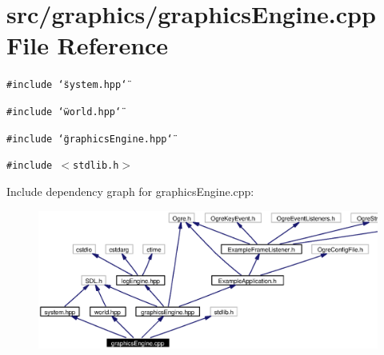 \section{src/graphics/graphics\-Engine.cpp File Reference}
\label{graphicsEngine_8cpp}
{\tt \#include \char`\"{}system.hpp\char`\"{}}\par
{\tt \#include \char`\"{}world.hpp\char`\"{}}\par
{\tt \#include \char`\"{}graphics\-Engine.hpp\char`\"{}}\par
{\tt \#include $<$stdlib.h$>$}\par


Include dependency graph for graphics\-Engine.cpp:\begin{figure}[H]
\begin{center}
\leavevmode
\includegraphics[width=390pt]{graphicsEngine_8cpp__incl}
\end{center}
\end{figure}
